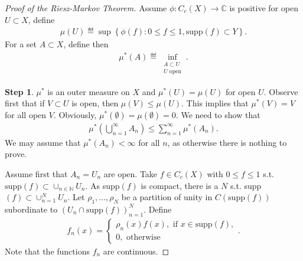 \begin{proof}[Proof of the Riesz-Markov Theorem]
    Assume \(\phi:C_c(X)\rightarrow\mathbb{C}\) is positive for open \(U\subset X\), define
    \begin{align*}
        \mu(U) \eqdef \sup\left\{\phi(f): 0\leq f\leq 1, \text{supp}(f) \subset Y\right\}.
    \end{align*}
    For a set \(A\subset X\), define then 
    \begin{align*}
        \mu^*(A) \eqdef \inf_{\substack{A\subset U \\ U\text{ open}}}.
    \end{align*}

    \textbf{Step 1}. \(\mu^*\) is an outer measure on \(X\) and \(\mu^*(U)=\mu(U)\) for open \(U\). Observe first that if \(V\subset U\) is open, then \(\mu(V)\leq\mu(U)\). This implies that \(\mu^*(V)=V\) for all open \(V\). Obviously, \(\mu^*(\emptyset)=\mu(\emptyset)=0\). We need to show that 
    \begin{align*}
        \mu^*\left(\bigcup\limits_{n=1}^{\infty}A_n\right) \leq \sum\limits_{n=1}^{\infty} \mu^*(A_n).
    \end{align*}
    We may assume that \(\mu^*(A_n)<\infty\) for all \(n\), as otherwise there is nothing to prove.

    Assume first that \(A_n=U_n\) are open. Take \(f\in C_c(X)\) with \(0\leq f\leq 1\) s.t. \(\text{supp}(f)\subset\cup_{n\in\mathbb{N}}U_n\). As supp\((f)\) is compact, there is a \(N\) s.t. supp\((f)\subset \cup_{n=1}^{N}U_n\). Let \(\rho_1, ..., \rho_N\) be a partition of unity  in \(C(\text{supp}(f))\) subordinate to \((U_n\cap\text{supp}(f))_{n=1}^{N}\). Define
    \begin{align*}
        f_n(x) = \begin{cases}
            \rho_n(x)f(x), \text{ if } x\in\text{supp}(f), \\
            0, \text{ otherwise}
        \end{cases}.
    \end{align*}
    Note that the functions \(f_n\) are continuous. 


\end{proof}

